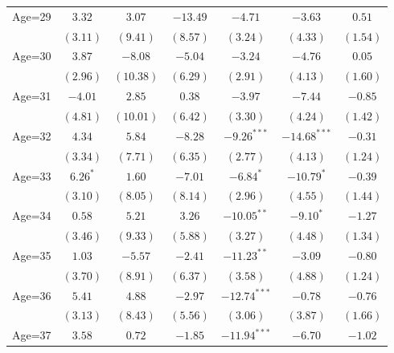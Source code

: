 \documentclass[fullpage]{paper}
\begin{document}
\begin{center}
\begin{longtable}{l c c c c c c }
Age=29      & $3.32$        & $3.07$        & $-13.49$       & $-4.71$        & $-3.63$        & $0.51$        \\
            & $(3.11)$      & $(9.41)$      & $(8.57)$       & $(3.24)$       & $(4.33)$       & $(1.54)$      \\
Age=30      & $3.87$        & $-8.08$       & $-5.04$        & $-3.24$        & $-4.76$        & $0.05$        \\
            & $(2.96)$      & $(10.38)$     & $(6.29)$       & $(2.91)$       & $(4.13)$       & $(1.60)$      \\
Age=31      & $-4.01$       & $2.85$        & $0.38$         & $-3.97$        & $-7.44$        & $-0.85$       \\
            & $(4.81)$      & $(10.01)$     & $(6.42)$       & $(3.30)$       & $(4.24)$       & $(1.42)$      \\
Age=32      & $4.34$        & $5.84$        & $-8.28$        & $-9.26^{***}$  & $-14.68^{***}$ & $-0.31$       \\
            & $(3.34)$      & $(7.71)$      & $(6.35)$       & $(2.77)$       & $(4.13)$       & $(1.24)$      \\
Age=33      & $6.26^{*}$    & $1.60$        & $-7.01$        & $-6.84^{*}$    & $-10.79^{*}$   & $-0.39$       \\
            & $(3.10)$      & $(8.05)$      & $(8.14)$       & $(2.96)$       & $(4.55)$       & $(1.44)$      \\
Age=34      & $0.58$        & $5.21$        & $3.26$         & $-10.05^{**}$  & $-9.10^{*}$    & $-1.27$       \\
            & $(3.46)$      & $(9.33)$      & $(5.88)$       & $(3.27)$       & $(4.48)$       & $(1.34)$      \\
Age=35      & $1.03$        & $-5.57$       & $-2.41$        & $-11.23^{**}$  & $-3.09$        & $-0.80$       \\
            & $(3.70)$      & $(8.91)$      & $(6.37)$       & $(3.58)$       & $(4.88)$       & $(1.24)$      \\
Age=36      & $5.41$        & $4.88$        & $-2.97$        & $-12.74^{***}$ & $-0.78$        & $-0.76$       \\
            & $(3.13)$      & $(8.43)$      & $(5.56)$       & $(3.06)$       & $(3.87)$       & $(1.66)$      \\
Age=37      & $3.58$        & $0.72$        & $-1.85$        & $-11.94^{***}$ & $-6.70$        & $-1.02$       \\

\end{longtable}
\end{center}
\end{document}
